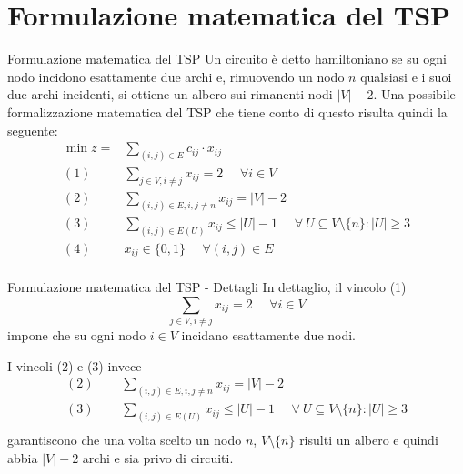 \documentclass[10pt]{beamer}
\begin{document}
\section{Formulazione matematica del TSP}
\begin{frame}{Formulazione matematica del TSP}
    Un circuito è detto hamiltoniano se su ogni nodo incidono esattamente due archi e, rimuovendo un nodo $n$ qualsiasi e i suoi due archi incidenti, si ottiene un albero sui rimanenti nodi $|V| - 2$. Una possibile formalizzazione matematica del TSP che tiene conto di questo risulta quindi la seguente:
    \begin{equation*}
      \begin{split}
        \min z = & \sum_{(i,j) \in E} c_{ij} \cdot x_{ij}\\
        (1)\:\:\:\:\:\: & \sum_{j \in V, i \neq j} x_{ij} = 2 \:\:\:\:\:\: \forall i \in V \\
        (2) \:\:\:\:\:\: & \sum_{(i,j)\in E, i, j \neq n} x_{ij} = |V|-2 \\
        (3) \:\:\:\:\:\: & \sum_{(i,j) \in E(U)} x_{ij} \leq |U| - 1 \:\:\:\:\:\: \forall\: U \subseteq V\setminus\{n\} : |U| \geq 3 \\
        (4) \:\:\:\:\:\: & x_{ij} \in \{0,1\} \:\:\:\:\:\: \forall (i,j) \in E\\
      \end{split}
    \end{equation*}
\end{frame}

\begin{frame}{Formulazione matematica del TSP - Dettagli}
    In dettaglio, il vincolo (1)
    \begin{equation*}
        \sum_{j \in V, i \neq j} x_{ij} = 2 \:\:\:\:\:\: \forall i \in V
    \end{equation*} impone che su ogni nodo $i \in V$ incidano esattamente due nodi.\newline
    
    I vincoli (2) e (3) invece
    \begin{equation*}
      \begin{split}
        (2) & \:\:\:\:\:\:  \sum_{(i,j)\in E, i, j \neq n} x_{ij} = |V|-2 \\
        (3) & \:\:\:\:\:\:  \sum_{(i,j) \in E(U)} x_{ij} \leq |U| - 1 \:\:\:\:\:\: \forall\: U \subseteq V\setminus\{n\} : |U| \geq 3\\
      \end{split}
    \end{equation*}
    garantiscono che una volta scelto un nodo $n$, $V \setminus \{n\}$ risulti un albero e quindi abbia $|V|-2$ archi e sia privo di circuiti.
\end{frame}
\end{document}
